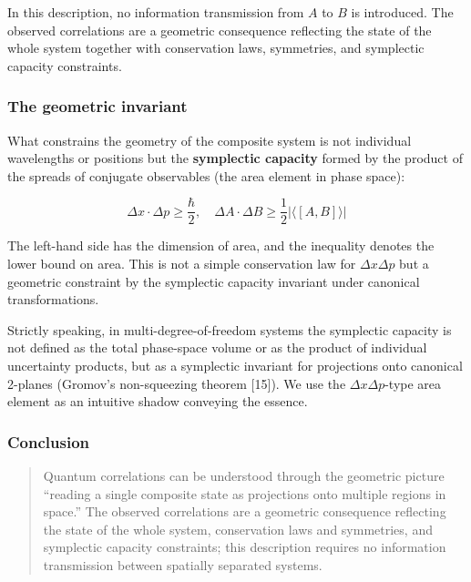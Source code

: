 \documentclass[
]{article}
\begin{document}
In this description, no information transmission from \(A\) to \(B\) is
introduced. The observed correlations are a geometric consequence
reflecting the state of the whole system together with conservation
laws, symmetries, and symplectic capacity constraints.

\subsubsection{The geometric invariant}\label{the-geometric-invariant}

What constrains the geometry of the composite system is not individual
wavelengths or positions but the \textbf{symplectic capacity} formed by
the product of the spreads of conjugate observables (the area element in
phase space):

\[\Delta x \cdot \Delta p \geq \frac{\hbar}{2}, \quad \Delta A \cdot \Delta B \geq \frac{1}{2}\left|\langle [A,B] \rangle\right|\]

The left-hand side has the dimension of area, and the inequality denotes
the lower bound on area. This is not a simple conservation law for
\(\Delta x \Delta p\) but a geometric constraint by the symplectic
capacity invariant under canonical transformations.

Strictly speaking, in multi-degree-of-freedom systems the symplectic
capacity is not defined as the total phase-space volume or as the
product of individual uncertainty products, but as a symplectic
invariant for projections onto canonical 2-planes (Gromov's
non-squeezing theorem {[}15{]}). We use the \(\Delta x \Delta p\)-type
area element as an intuitive shadow conveying the essence.

\subsubsection{Conclusion}\label{conclusion-3}

\begin{quote}
Quantum correlations can be understood through the geometric picture
``reading a single composite state as projections onto multiple regions
in space.'' The observed correlations are a geometric consequence
reflecting the state of the whole system, conservation laws and
symmetries, and symplectic capacity constraints; this description
requires no information transmission between spatially separated
systems.
\end{quote}
\end{document}
